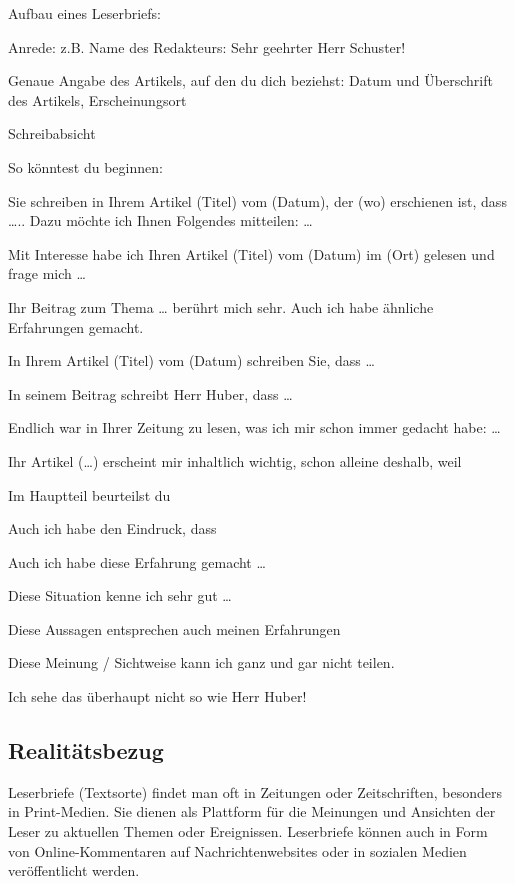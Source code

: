 Aufbau eines Leserbriefs: 
\begin{compactitem}
    
    \item Anrede: z.B. Name des Redakteurs: Sehr geehrter Herr Schuster! 
    \item Genaue Angabe des Artikels, auf den du dich beziehst: Datum und Überschrift des Artikels, Erscheinungsort 
    \item Schreibabsicht 
\end{compactitem}
So könntest du beginnen: 
\begin{compactitem}
    \item Sie schreiben in Ihrem Artikel (Titel) vom (Datum), der (wo) erschienen ist, dass ….. Dazu möchte ich Ihnen Folgendes mitteilen: … 
    \item Mit Interesse habe ich Ihren Artikel (Titel) vom (Datum) im (Ort) gelesen und frage mich … 
    \item Ihr Beitrag zum Thema … berührt mich sehr. Auch ich habe ähnliche Erfahrungen gemacht. 
    \item In Ihrem Artikel (Titel) vom (Datum) schreiben Sie, dass … 
    \item In seinem Beitrag schreibt Herr Huber, dass … 
    \item Endlich war in Ihrer Zeitung zu lesen, was ich mir schon immer gedacht habe: … 
    \item Ihr Artikel (…) erscheint mir inhaltlich wichtig, schon alleine deshalb, weil 
\end{compactitem}
Im Hauptteil beurteilst du 
\begin{compactitem}
    \item Auch ich habe den Eindruck, dass 
    \item Auch ich habe diese Erfahrung gemacht … 
    \item  Diese Situation kenne ich sehr gut … 
    \item Diese Aussagen entsprechen auch meinen Erfahrungen 
    \item Diese Meinung / Sichtweise kann ich ganz und gar nicht teilen.  
    \item Ich sehe das überhaupt nicht so wie Herr Huber! 
\end{compactitem}
\subsection{Realitätsbezug}
Leserbriefe (Textsorte) findet man oft in Zeitungen oder Zeitschriften, besonders in Print-Medien. Sie dienen als Plattform für die Meinungen und Ansichten der Leser zu aktuellen Themen oder Ereignissen. Leserbriefe können auch in Form von Online-Kommentaren auf Nachrichtenwebsites oder in sozialen Medien veröffentlicht werden. 